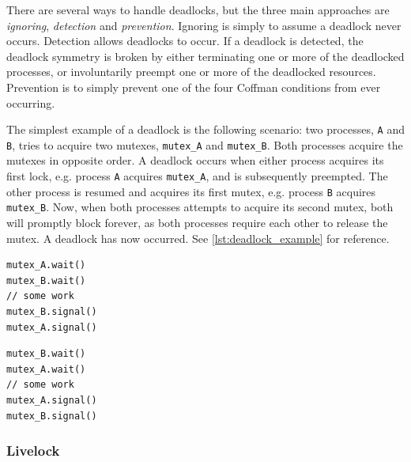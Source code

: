 There are several ways to handle deadlocks, but the three main approaches are \textit{ignoring}, \textit{detection} and \textit{prevention}. Ignoring is simply to assume a deadlock never occurs. Detection allows deadlocks to occur. If a deadlock is detected, the deadlock symmetry is broken by either terminating one or more of the deadlocked processes, or involuntarily preempt one or more of the deadlocked resources. Prevention is to simply prevent one of the four Coffman conditions from ever occurring.

The simplest example of a deadlock is the following scenario: two processes, \texttt{A} and \texttt{B}, tries to acquire two mutexes, \texttt{mutex\_A} and \texttt{mutex\_B}. Both processes acquire the mutexes in opposite order. A deadlock occurs when either process acquires its first lock, e.g. process \texttt{A} acquires \texttt{mutex\_A}, and is subsequently preempted. The other process is resumed and acquires its first mutex, e.g. process \texttt{B} acquires \texttt{mutex\_B}. Now, when both processes attempts to acquire its second mutex, both will promptly block forever, as both processes require each other to release the mutex. A deadlock has now occurred. See \cref{lst:deadlock_example} for reference.

\begin{lstfloat}
\noindent\begin{minipage}{0.45\textwidth}
\begin{lstlisting}[title={Process A},style={CustomC},frame={},xleftmargin={4em}]
mutex_A.wait()
mutex_B.wait()
// some work
mutex_B.signal()
mutex_A.signal()
\end{lstlisting}
\end{minipage}
\begin{minipage}{0.45\textwidth}
\begin{lstlisting}[title={Process B},style={CustomC},frame={},xleftmargin={4em}]
mutex_B.wait()
mutex_A.wait()
// some work
mutex_A.signal()
mutex_B.signal()
\end{lstlisting}
\end{minipage}
\label{lst:deadlock_example}
\end{lstfloat}

\subsubsection{Livelock}


